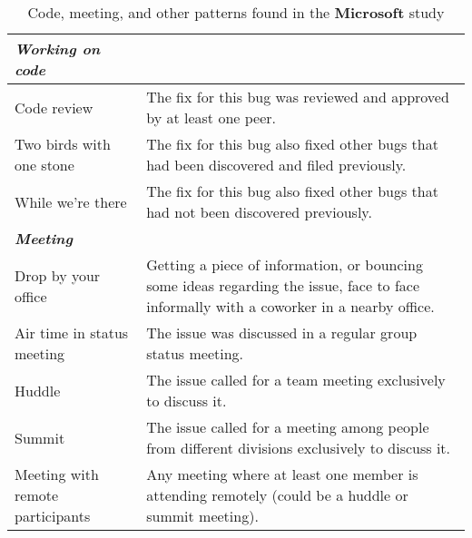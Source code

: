 \begin{table}[tbp]
\caption{\label{tab:MicrosoftPatterns2} Code, meeting, and other patterns found in the \textbf{Microsoft} study}
\centering
\footnotesize{\begin{tabular}{p{2.4cm}p{12.2cm}}
\hline \hline
\vspace{1pt} \bfseries \emph{Working on code} & \vspace{1pt} \\
\hline
\vspace{0.5pt} Code review & \vspace{0.5pt} The fix for this bug was reviewed and approved by at least one peer. \\
\hline
\vspace{0.5pt} Two birds with one stone & \vspace{0.5pt} The fix for this bug also fixed other bugs that had been discovered and filed previously. \\
\hline
\vspace{0.5pt} While we're there & \vspace{0.5pt} The fix for this bug also fixed other bugs that had not been discovered previously. \\
\hline
\hline
\vspace{1pt} \bfseries \emph{Meeting} & \vspace{1pt} \\
\hline
\vspace{0.5pt} Drop by your office & \vspace{0.5pt} Getting a piece of information, or bouncing some ideas regarding the issue, face to face informally with a coworker in a nearby office. \\
\hline
\vspace{0.5pt} Air time in status meeting & \vspace{0.5pt} The issue was discussed in a regular group status meeting. \\
\hline
\vspace{0.5pt} Huddle & \vspace{0.5pt} The issue called for a team meeting exclusively to discuss it. \\
\hline
\vspace{0.5pt} Summit & \vspace{0.5pt} The issue called for a meeting among people from different divisions exclusively to discuss it. \\
\hline
\vspace{0.5pt} Meeting with remote participants & \vspace{0.5pt} Any meeting where at least one member is attending remotely (could be a huddle or summit meeting). \\

\end{tabular}}
\end{table}
